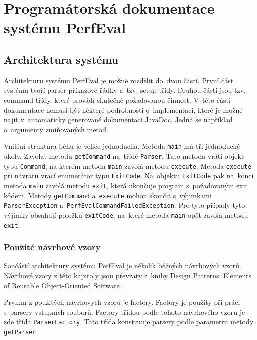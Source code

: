 \chapter{Programátorská dokumentace systému PerfEval}

\section{Architektura systému}

Architekturu systému PerfEval je možné rozdělit do~dvou částí. První část systému tvoří
parser příkazové řádky a~tzv. setup třídy. Druhou částí jsou tzv. command třídy,
které provádí skutečně požadovanou činnost. V~této části dokumentace nemusí být
některé podrobnosti o~implementaci, které je možné najít v~automaticky generované dokumentaci
JavaDoc. Jedná se například o~argumenty zmiňovaných metod.

Vnitřní struktura běhu je velice jednoduchá. Metoda \lstinline{main} má tři jednoduché úkoly.
Zavolat metodu \lstinline{getCommand} na~třídě \lstinline{Parser}. Tato metoda vrátí objekt typu \lstinline{Command},
na kterém metoda \lstinline{main} zavolá metodu \lstinline{execute}. Metoda \lstinline{execute} při návratu vrací enumerátor
typu \lstinline{ExitCode}. Na~objektu \lstinline{ExitCode} pak na~konci metoda \lstinline{main} zavolá metodu \lstinline[keywords={}]{exit},
která ukončuje program s~požadovaným exit kódem. Metody \lstinline{getCommand} a~\lstinline{execute} mohou skončit
s~výjimkami \lstinline{ParserException} a~\lstinline{PerfEvalCommandFailedException}. Pro tyto případy tyto
výjimky obsahují položku \lstinline{exitCode}, na~které metoda \lstinline{main} opět zavolá metodu \lstinline[keywords={}]{exit}.

\subsection{Použité návrhové vzory}

Součástí architektury systému PerfEval je několik běžných návrhových vzorů.
Návrhové vzory z této kapitoly jsou převzaty z~knihy Design Patterns: Elements of Reusable Object-Oriented Software \cite{Patterns}.

Prvním z použitých návrhových vzorů je factory. Factory je použitý
při práci s~parsery vstupních souborů. Factory třídou podle tohoto návrhového vzoru je
zde třída \lstinline{ParserFactory}. Tato třída konstruuje parsery podle parametru metody
\lstinline{getParser}.

